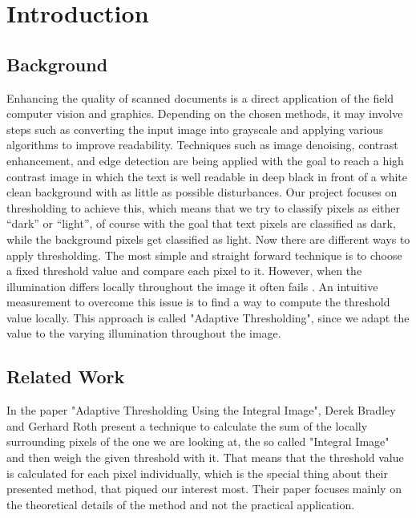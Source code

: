 \documentclass[sigconf]{acmart}
\begin{document}
\let\thefootnote\relax{}



\section{Introduction}

\subsection{Background}

 Enhancing the quality of scanned documents is a direct application of the field computer vision and graphics. Depending on the chosen methods, it may involve steps such as converting the input image into grayscale and applying various algorithms to improve readability. Techniques such as image denoising, contrast enhancement, and edge detection are being applied with the goal to reach a high contrast image in which the text is well readable in deep black in front of a white clean background with as little as possible disturbances. Our project focuses on thresholding to achieve this, which means that we try to classify pixels as either “dark” or “light”, of course with the goal that text pixels are classified as dark, while the background pixels get classified as light. Now there are different ways to apply thresholding. The most simple and straight forward technique is to choose a fixed threshold value and compare each pixel to it. However, when the illumination differs locally throughout the image it often fails \cite{LecSource2}. An intuitive measurement to overcome this issue is to find a way to compute the threshold value locally. This approach is called "Adaptive Thresholding", since we adapt the value to the varying illumination throughout the image.

\subsection{Related Work}

In the paper "Adaptive Thresholding Using the Integral Image", Derek Bradley and Gerhard Roth present a technique to calculate the sum of the locally surrounding pixels of the one we are looking at, the so called "Integral Image" and then weigh the given threshold with it. That means that the threshold value is calculated for each pixel individually, which is the special thing about their presented method, that piqued our interest most. Their paper focuses mainly on the theoretical details of the method and not the practical application.
\end{document}
